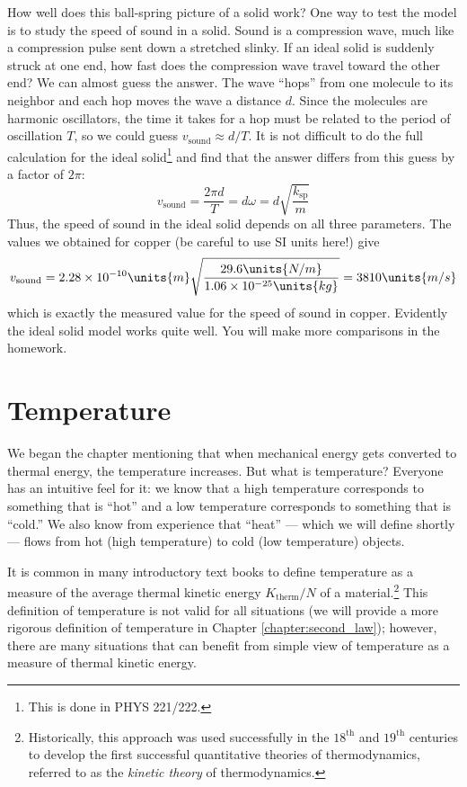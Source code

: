 How well does this ball-spring picture of a solid work? 
One way to test the model is to study the speed of sound in a
solid.  Sound is a compression wave, much like a compression pulse
sent down a stretched slinky.  If an ideal solid is suddenly
struck at one end, how fast does the compression wave travel toward
the other end?  We can almost guess the answer.  The wave ``hops''
from one molecule to its neighbor and each hop moves the wave a
distance $d$.  Since the molecules are harmonic oscillators, the time
it takes for a hop must be related to the period of oscillation $T$,
so we could guess $v_\text{sound} \approx d/T$.  It is not difficult
to do the full calculation for the ideal solid\footnote{This is
  done in PHYS 221/222.} and find that the answer differs from this
guess by a factor of $2\pi$:
\begin{equation}
v_\text{sound} = \frac{2\pi d}{T} = d\omega  = d\sqrt{\frac{k_\text{sp}}{m}}
\end{equation}
Thus, the speed of sound in the ideal solid depends on all three
parameters.  The values we obtained for copper (be careful to use SI
units here!) give
\begin{equation}
 v_\text{sound} = 2.28\times
 10^{-10}\units{m}\sqrt{\frac{29.6\units{N/m}}{1.06\times
     10^{-25}\units{kg}}} = 3810\units{m/s}
\end{equation}
which is exactly the measured value for the speed of sound in copper.
Evidently the ideal solid model works quite well.  You will make more
comparisons in the homework.

\section{Temperature}

We began the chapter mentioning that when mechanical energy gets
converted to thermal energy, the temperature increases.  But what is
temperature?  Everyone has an intuitive feel for it:  we know that a
high temperature corresponds to something that is ``hot'' and a low
temperature corresponds to something that is ``cold.''  We also know
from experience that ``heat'' --- which we will define shortly --- flows
from hot (high temperature) to cold (low temperature) objects.

It is common in many introductory text books to define temperature as
a measure of the average thermal kinetic energy $K_\text{therm}/N$ of
a material.\footnote{Historically, this approach was used successfully
  in the $18^\text{th}$ and $19^\text{th}$ centuries to develop the
  first successful quantitative theories of thermodynamics, referred
  to as the {\em kinetic theory} of thermodynamics.}  This definition of
temperature is not valid for all situations (we will provide a more
rigorous definition of temperature in Chapter
\ref{chapter:second_law}); however, there are many situations that can
benefit from simple view of temperature as a measure of thermal
kinetic energy.

